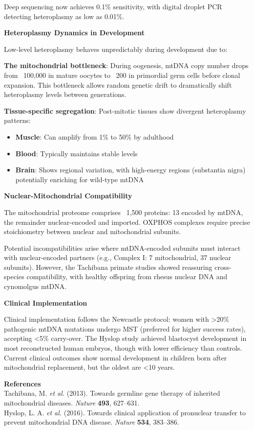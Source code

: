 \begin{technical}
Deep sequencing now achieves 0.1\% sensitivity, with digital droplet PCR detecting heteroplasmy as low as 0.01\%.

\noindent\textbf{Heteroplasmy Dynamics in Development}

Low-level heteroplasmy behaves unpredictably during development due to:

\textbf{The mitochondrial bottleneck}: During oogenesis, mtDNA copy number drops from ~100,000 in mature oocytes to ~200 in primordial germ cells before clonal expansion. This bottleneck allows random genetic drift to dramatically shift heteroplasmy levels between generations.

\columnbreak

\textbf{Tissue-specific segregation}: Post-mitotic tissues show divergent heteroplasmy patterns:
\begin{itemize}[leftmargin=*]
\item \textbf{Muscle}: Can amplify from 1\% to 50\% by adulthood
\item \textbf{Blood}: Typically maintains stable levels
\item \textbf{Brain}: Shows regional variation, with high-energy regions (substantia nigra) potentially enriching for wild-type mtDNA
\end{itemize}


\noindent\textbf{Nuclear-Mitochondrial Compatibility}

The mitochondrial proteome comprises ~1,500 proteins: 13 encoded by mtDNA, the remainder nuclear-encoded and imported. OXPHOS complexes require precise stoichiometry between nuclear and mitochondrial subunits.

Potential incompatibilities arise where mtDNA-encoded subunits must interact with nuclear-encoded partners (e.g., Complex I: 7 mitochondrial, 37 nuclear subunits). However, the Tachibana primate studies showed reassuring cross-species compatibility, with healthy offspring from rhesus nuclear DNA and cynomolgus mtDNA.

\noindent\textbf{Clinical Implementation}

Clinical implementation follows the Newcastle protocol: women with >20\% pathogenic mtDNA mutations undergo MST (preferred for higher success rates), accepting <5\% carry-over. The Hyslop study achieved blastocyst development in most reconstructed human embryos, though with lower efficiency than controls. Current clinical outcomes show normal development in children born after mitochondrial replacement, but the oldest are <10 years.

\vspace{0.5em}
\noindent\textbf{References}\\
Tachibana, M. \textit{et al.} (2013). Towards germline gene therapy of inherited mitochondrial diseases. \textit{Nature} \textbf{493}, 627–631.\\
Hyslop, L. A. \textit{et al.} (2016). Towards clinical application of pronuclear transfer to prevent mitochondrial DNA disease. \textit{Nature} \textbf{534}, 383–386.
\end{technical}